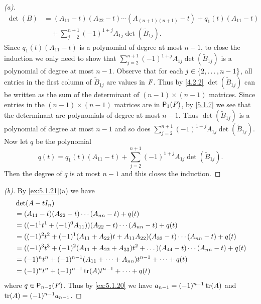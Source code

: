 \begin{proof}[(a)]
\begin{align*}
    \det(B) & = (A_{1 1} - t) (A_{2 2} - t) \cdots (A_{(n + 1) (n + 1)} - t) + q_1(t) (A_{1 1} - t) \\
            & \quad + \sum_{j = 2}^{n + 1} (-1)^{1 + j} A_{1 j} \det(\tilde{B}_{1 j}).
  \end{align*}
  Since \(q_1(t) (A_{1 1} - t)\) is a polynomial of degree at most \(n - 1\),  to close the induction we only need to show that \(\sum_{j = 2}^{n + 1} (-1)^{1 + j} A_{1 j} \det(\tilde{B}_{1 j})\) is a polynomial of degree at most \(n - 1\).
  Observe that for each \(j \in \left\lbrace2, \dots, n - 1\right\rbrace\), all entries in the first column of \(\tilde{B}_{1 j}\) are values in \(\mathit{F}\).
  Thus by \cref{4.2.2} \(\det(\tilde{B}_{1 j})\) can be written as the sum of the determinant of \((n - 1) \times (n - 1)\) matrices.
  Since entries in the \((n - 1) \times (n - 1)\) matrices are in \(\ps[1]{\F}\), by \cref{5.1.7} we see that the determinant are polynomials of degree at most \(n - 1\).
  Thus \(\det(\tilde{B}_{1 j})\) is a polynomial of degree at most \(n - 1\) and so does \(\sum_{j = 2}^{n + 1} (-1)^{1 + j} A_{1 j} \det(\tilde{B}_{1 j})\).
  Now let \(q\) be the polynomial
  \[
    q(t) = q_1(t) (A_{1 1} - t) + \sum_{j = 2}^{n + 1} (-1)^{1 + j} A_{1 j} \det(\tilde{B}_{1 j}).
  \]
  Then the degree of \(q\) is at most \(n - 1\) and this closes the induction.
\end{proof}

\begin{proof}[(b)]
  By \cref{ex:5.1.21}(a) we have
  \begin{align*}
     & \det(A - t I_n)                                                                                             \\
     & = (A_{1 1} - t) (A_{2 2} - t) \cdots (A_{n n} - t) + q(t)                                                   \\
     & = ((-1^1 t^1 + (-1)^0 A_{1 1})) (A_{2 2} - t) \cdots (A_{n n} - t) + q(t)                                   \\
     & = ((-1)^2 t^2 + (-1)^1 (A_{1 1} + A_{2 2}) t + A_{1 1} A_{2 2}) (A_{3 3} - t) \cdots (A_{n n} - t) + q(t)   \\
     & = ((-1)^3 t^3 + (-1)^2 (A_{1 1} + A_{2 2} + A_{3 3}) t^2 + \dots) (A_{4 4} - t) \cdots (A_{n n} - t) + q(t) \\
     & = (-1)^n t^n + (-1)^{n - 1} (A_{1 1} + \cdots + A_{n n}) t^{n - 1} + \cdots + q(t)                          \\
     & = (-1)^n t^n + (-1)^{n - 1} \tr(A) t^{n - 1} + \cdots + q(t)
  \end{align*}
  where \(q \in \ps[n - 2]{\F}\).
  Thus by \cref{ex:5.1.20} we have \(a_{n - 1} = (-1)^{n - 1} \tr(A)\) and \(\tr(A) = (-1)^{n - 1} a_{n - 1}\).
\end{proof}

